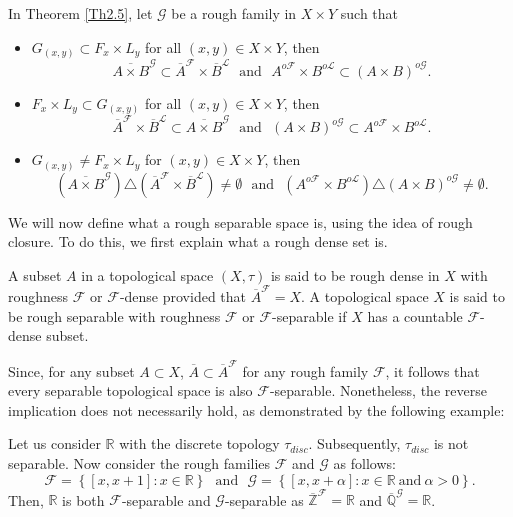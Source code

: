 \documentclass[11pt]{amsart}
\begin{document}
\begin{remark}
    In Theorem \ref{Th2.5}, let $\mathcal{G}$ be a rough family in $X\times Y$ such that \begin{itemize}
        \item[(i)] $G_{(x,y)}\subset F_x\times L_y$ for all $(x,y)\in X\times Y$, then 
    $$\overline{A\times B}^{\mathcal{G}}\subset \overline{A}^\mathscr{F}\times \overline{B}^{\mathscr{L}} ~~~\text{and}~~~A^{o\mathscr{F}}\times B^{o\mathscr{L}}\subset(A\times B)^{o\mathcal{G}}.$$

     \item[(ii)] $F_x\times L_y\subset G_{(x,y)}$ for all $(x,y)\in X\times Y$, then
    $$\overline{A}^\mathscr{F}\times \overline{B}^{\mathscr{L}}\subset\overline{A\times B}^{\mathcal{G}}~~~\text{and}~~~(A\times B)^{o\mathcal{G}}\subset A^{o\mathscr{F}}\times B^{o\mathscr{L}}.$$

    \item[(iii)] $G_{(x,y)}\neq F_x\times L_y$ for $(x,y)\in X\times Y$, then 
    $$\left(\overline{A\times B}^{\mathcal{G}}\right)\triangle\left(\overline{A}^\mathscr{F}\times \overline{B}^{\mathscr{L}}\right)\neq\emptyset~~~\text{and}~~~\left(A^{o\mathscr{F}}\times B^{o\mathscr{L}}\right)\triangle(A\times B)^{o\mathcal{G}}\neq \emptyset.$$
    \end{itemize}
\end{remark}

We will now define what a rough separable space is, using the idea of rough closure. To do this, we first explain what a rough dense set is. 


\begin{definition}
    A subset $A$ in a topological space $(X,\tau)$ is said to be rough dense in $X$ with roughness $\mathscr{F}$ or $\mathscr{F}$-dense provided that $\overline{A}^\mathscr{F}=X$. A topological space $X$ is said to be rough separable with roughness $\mathscr{F}$ or $\mathscr{F}$-separable if $X$ has a countable $\mathscr{F}$-dense subset.
\end{definition}

Since, for any subset $A \subset X$, $\overline{A}\subset\overline{A}^\mathscr{F}$ for any rough family $\mathscr{F}$, it follows that every separable topological space is also $\mathscr{F}$-separable. Nonetheless, the reverse implication does not necessarily hold, as demonstrated by the following example:

\begin{example}
    Let us consider $\mathbb{R}$ with the discrete topology $\tau_{disc}$. Subsequently, $\tau_{disc}$ is not separable. Now consider the rough families $\mathscr{F}$ and $\mathcal{G}$ as follows: $$\mathscr{F}=\left\{[x,x+1]: x\in \mathbb{R}\right\}~~~\text{and}~~~\mathcal{G}=\left\{[x,x+\alpha]: x\in \mathbb{R}~\text{and}~\alpha>0\right\}.$$
    Then, $\mathbb{R}$ is both $\mathscr{F}$-separable and $\mathcal{G}$-separable as $\overline{\mathbb{Z}}^\mathscr{F}=\mathbb{R}$ and $\overline{\mathbb{Q}}^\mathcal{G}=\mathbb{R}$.
\end{example}
\end{document}
